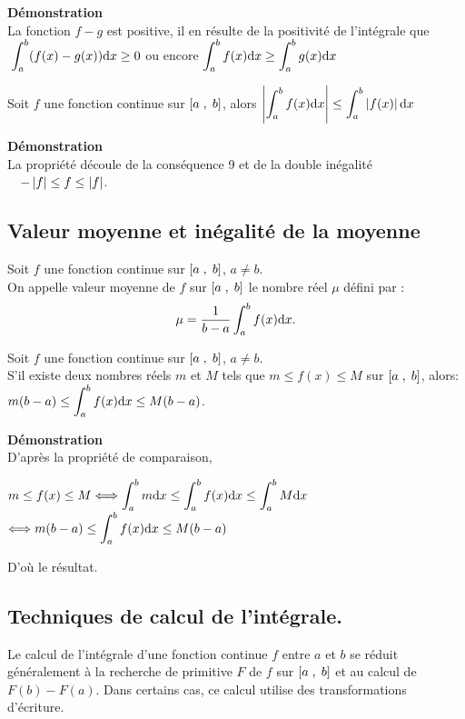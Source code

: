 \textbf{Démonstration}\\
La fonction  $f - g$   est positive, il en résulte de la positivité de l'intégrale que  $ \;\displaystyle\int_{a}^{b}(f(x)-g(x)){\rm d}x\geq 0 $  ou encore $  \displaystyle\int_{a}^{b}f(x){\rm d}x\geq \displaystyle\int_{a}^{b}g(x){\rm d}x $

\begin{corollary}
Soit $f$ une  fonction continue sur $ \left[a\;,\; b\right] $, alors 
   $ \left\lvert  \displaystyle\int_{a}^{b}f(x){\rm d}x \right\rvert \leq \displaystyle\int_{a}^{b}\left\lvert f(x) \right\rvert{\rm d}x $
\end{corollary}
\textbf{Démonstration}\\
La propriété découle de la conséquence 9  et de la double inégalité $\quad -\left\lvert f \right\rvert \leq f\leq \left\lvert f \right\rvert$.
\subsection{Valeur moyenne et inégalité de la moyenne}
\begin{definition}
Soit $f$ une fonction continue  sur $\left[a\;,\; b\right]$, $a\neq b$.\\
On appelle valeur moyenne de $f$ sur $\left[a\;,\; b\right]$ le nombre réel $ \mu $ défini par :
\[
\mu=\dfrac{1}{b-a}\displaystyle\int_{a}^{b}f(x){\rm d}x.
\]
\end{definition}

\begin{theorem}
Soit $f$ une fonction continue sur $ \left[a\;,\; b\right] $, $a\neq b$.\\
S'il existe deux nombres réels $m$ et $M$ tels que $m\leq f(x)\leq M$ sur $\left[a\;,\; b\right]$, alors:\\ $m(b-a) \leq \displaystyle\int_{a}^{b}f(x){\rm d}x \leq M(b-a)$.
\end{theorem}

\textbf{Démonstration}\\
D'après la propriété de comparaison,

$m \leq f(x) \leq M  \Longleftrightarrow \displaystyle\int_{a}^{b}m{\rm d}x  \leq \displaystyle\int_{a}^{b}f(x){\rm d}x  \leq \displaystyle\int_{a}^{b}M{\rm d}x  $\\
$\Longleftrightarrow m(b-a)\leq\displaystyle\int_{a}^{b}f(x){\rm d}x \leq M(b-a)$

D'où le résultat.
\subsection{Techniques de calcul de l'intégrale.}
Le calcul de l'intégrale d'une fonction continue $f$ entre $ a $ et $ b $ se réduit généralement à la recherche de primitive $F$ de $f$ sur $ \left[a\;,\; b\right] $ et au calcul de $ F(b)-F(a) $. Dans certains cas, ce  calcul utilise des transformations d'écriture.
